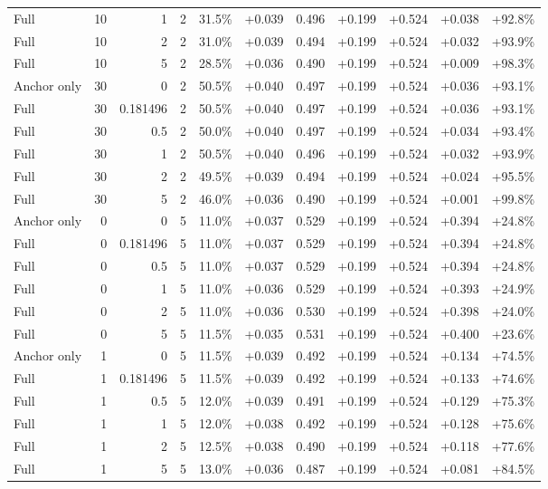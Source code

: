 \begin{table}[htbp]
\begin{tabular}{lrrrccccccc}
Full & 10 & 1 & 2 & 31.5\% & +0.039 & 0.496 & +0.199 & +0.524 & +0.038 & +92.8\% \\
Full & 10 & 2 & 2 & 31.0\% & +0.039 & 0.494 & +0.199 & +0.524 & +0.032 & +93.9\% \\
Full & 10 & 5 & 2 & 28.5\% & +0.036 & 0.490 & +0.199 & +0.524 & +0.009 & +98.3\% \\
Anchor only & 30 & 0 & 2 & 50.5\% & +0.040 & 0.497 & +0.199 & +0.524 & +0.036 & +93.1\% \\
Full & 30 & 0.181496 & 2 & 50.5\% & +0.040 & 0.497 & +0.199 & +0.524 & +0.036 & +93.1\% \\
Full & 30 & 0.5 & 2 & 50.0\% & +0.040 & 0.497 & +0.199 & +0.524 & +0.034 & +93.4\% \\
Full & 30 & 1 & 2 & 50.5\% & +0.040 & 0.496 & +0.199 & +0.524 & +0.032 & +93.9\% \\
Full & 30 & 2 & 2 & 49.5\% & +0.039 & 0.494 & +0.199 & +0.524 & +0.024 & +95.5\% \\
Full & 30 & 5 & 2 & 46.0\% & +0.036 & 0.490 & +0.199 & +0.524 & +0.001 & +99.8\% \\
Anchor only & 0 & 0 & 5 & 11.0\% & +0.037 & 0.529 & +0.199 & +0.524 & +0.394 & +24.8\% \\
Full & 0 & 0.181496 & 5 & 11.0\% & +0.037 & 0.529 & +0.199 & +0.524 & +0.394 & +24.8\% \\
Full & 0 & 0.5 & 5 & 11.0\% & +0.037 & 0.529 & +0.199 & +0.524 & +0.394 & +24.8\% \\
Full & 0 & 1 & 5 & 11.0\% & +0.036 & 0.529 & +0.199 & +0.524 & +0.393 & +24.9\% \\
Full & 0 & 2 & 5 & 11.0\% & +0.036 & 0.530 & +0.199 & +0.524 & +0.398 & +24.0\% \\
Full & 0 & 5 & 5 & 11.5\% & +0.035 & 0.531 & +0.199 & +0.524 & +0.400 & +23.6\% \\
Anchor only & 1 & 0 & 5 & 11.5\% & +0.039 & 0.492 & +0.199 & +0.524 & +0.134 & +74.5\% \\
Full & 1 & 0.181496 & 5 & 11.5\% & +0.039 & 0.492 & +0.199 & +0.524 & +0.133 & +74.6\% \\
Full & 1 & 0.5 & 5 & 12.0\% & +0.039 & 0.491 & +0.199 & +0.524 & +0.129 & +75.3\% \\
Full & 1 & 1 & 5 & 12.0\% & +0.038 & 0.492 & +0.199 & +0.524 & +0.128 & +75.6\% \\
Full & 1 & 2 & 5 & 12.5\% & +0.038 & 0.490 & +0.199 & +0.524 & +0.118 & +77.6\% \\
Full & 1 & 5 & 5 & 13.0\% & +0.036 & 0.487 & +0.199 & +0.524 & +0.081 & +84.5\% \\

\end{tabular}
\end{table}
